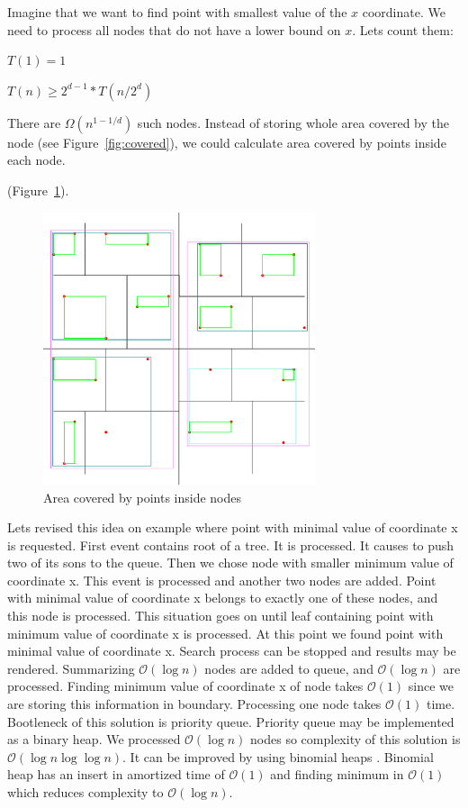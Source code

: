 \documentclass[10pt,a4paper]{article}
\newcommand{\Oh}{\mathcal{O}}
\begin{document}
Imagine that we want to find point with smallest value of the $x$ coordinate. We need to process all nodes
that do not have a lower bound on $x$. Lets count them:
\bigskip

$T(1) = 1$

$T(n) \geq 2^{d-1} * T(n/2^{d})$

\bigskip

There are $\Omega (n^{1-1/d})$ such nodes. Instead of storing whole area covered by the node (see Figure~\ref{fig:covered}), we could calculate area covered by points inside each node. 

 (Figure~\ref{fig:inside}).

\begin{figure}
\centering
  \includegraphics[width=8cm]{Figure2}
  \caption{Area covered by points inside nodes}
  \label{fig:inside}
\end{figure}

Lets revised this idea on example where point with minimal value of coordinate x is requested. First event contains root of a tree. It is processed. It causes to push two of its sons to the queue. Then we chose node with smaller minimum value of coordinate x. This event is processed and another two nodes are added. Point with minimal value of coordinate x belongs to exactly one of these nodes, and this node is processed. This situation goes on until leaf containing point with minimum value of coordinate x is processed. At this point we found point with minimal value of coordinate x. Search process can be stopped and results may be rendered. Summarizing $\Oh(\log n)$ nodes are added to queue, and $\Oh(\log n)$ are processed. Finding minimum value of coordinate x of node takes $\Oh(1)$ since we are storing this information in boundary. Processing one node takes $\Oh(1)$ time. Bootleneck of this solution is priority queue. Priority queue may be implemented as a binary heap. We processed $\Oh(\log n)$ nodes so complexity of this solution is $\Oh(\log n \log \log n)$. It can be improved by using binomial heaps \cite{BINOMHEAPS}. Binomial heap has an insert in amortized time of $\Oh(1)$ and finding minimum in $\Oh(1)$ which reduces complexity to $\Oh(\log n)$.
\end{document}
